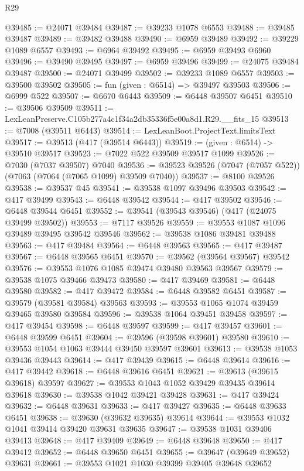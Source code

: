 \begin{lexlean}{R29}
\begin{coremodule}
@39485 := @24071 @39484
@39487 := @39233 @1078 @6553
@39488 := @39485 @39487
@39489 := @39482 @39488
@39490 := @6959 @39489
@39492 := @39229 @1089 @6557
@39493 := @6964 @39492
@39495 := @6959 @39493 @6960
@39496 := @39490 @39495
@39497 := @6959 @39496
@39499 := @24075 @39484 @39487
@39500 := @24071 @39499
@39502 := @39233 @1089 @6557
@39503 := @39500 @39502
@39505 := fun (given : @6514) => @39497 @39503
@39506 := @6999 @522
@39507 := @6670 @6443
@39509 := @6448 @39507 @6451
@39510 := @39506 @39509
@39511 := LexLeanPreserve.C105b277a4c1f34a2db35336f5e00a8d1.R29.__fits_15
@39513 := @7008 (@39511 @6443)
@39514 := LexLeanBoot.ProjectText.limitsText
@39517 := @39513 (@417 (@39514 @6443))
@39519 := (given : @6514) -> @39510 @39517
@39523 := @7022 @522 @39509 @39517 @1099
@39526 := @7030 (@7037 @39507) @7040
@39536 := @39523 @39526 (@7047 (@7057 @522)) (@7063 (@7064 (@7065 @1099) @39509 @7040))
@39537 := @8100 @39526
@39538 := @39537 @45
@39541 := @39538 @1097 @39496 @39503
@39542 := @417 @39499
@39543 := @6448 @39542
@39544 := @417 @39502
@39546 := @6448 @39544 @6451
@39552 := @39541 (@39543 @39546) (@417 (@24075 @39499 @39502))
@39553 := @7117 @39526
@39559 := @39553 @1087 @1096 @39489 @39495 @39542 @39546
@39562 := @39538 @1086 @39481 @39488
@39563 := @417 @39484
@39564 := @6448 @39563
@39565 := @417 @39487
@39567 := @6448 @39565 @6451
@39570 := @39562 (@39564 @39567) @39542
@39576 := @39553 @1076 @1085 @39474 @39480 @39563 @39567
@39579 := @39538 @1075 @39466 @39473
@39580 := @417 @39469
@39581 := @6448 @39580
@39582 := @417 @39472
@39584 := @6448 @39582 @6451
@39587 := @39579 (@39581 @39584) @39563
@39593 := @39553 @1065 @1074 @39459 @39465 @39580 @39584
@39596 := @39538 @1064 @39451 @39458
@39597 := @417 @39454
@39598 := @6448 @39597
@39599 := @417 @39457
@39601 := @6448 @39599 @6451
@39604 := @39596 (@39598 @39601) @39580
@39610 := @39553 @1054 @1063 @39444 @39450 @39597 @39601
@39613 := @39538 @1053 @39436 @39443
@39614 := @417 @39439
@39615 := @6448 @39614
@39616 := @417 @39442
@39618 := @6448 @39616 @6451
@39621 := @39613 (@39615 @39618) @39597
@39627 := @39553 @1043 @1052 @39429 @39435 @39614 @39618
@39630 := @39538 @1042 @39421 @39428
@39631 := @417 @39424
@39632 := @6448 @39631
@39633 := @417 @39427
@39635 := @6448 @39633 @6451
@39638 := @39630 (@39632 @39635) @39614
@39644 := @39553 @1032 @1041 @39414 @39420 @39631 @39635
@39647 := @39538 @1031 @39406 @39413
@39648 := @417 @39409
@39649 := @6448 @39648
@39650 := @417 @39412
@39652 := @6448 @39650 @6451
@39655 := @39647 (@39649 @39652) @39631
@39661 := @39553 @1021 @1030 @39399 @39405 @39648 @39652

\end{coremodule}
\end{lexlean}
